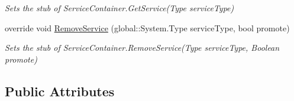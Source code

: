 \begin{DoxyCompactItemize}
\begin{DoxyCompactList}\small\item\em Sets the stub of Service\-Container.\-Get\-Service(\-Type service\-Type)\end{DoxyCompactList}\item 
override void \hyperlink{class_system_1_1_component_model_1_1_design_1_1_fakes_1_1_stub_service_container_a8fb845df1050ead985920269b936b8bf}{Remove\-Service} (global\-::\-System.\-Type service\-Type, bool promote)
\begin{DoxyCompactList}\small\item\em Sets the stub of Service\-Container.\-Remove\-Service(\-Type service\-Type, Boolean promote)\end{DoxyCompactList}\end{DoxyCompactItemize}
\subsection*{Public Attributes}
